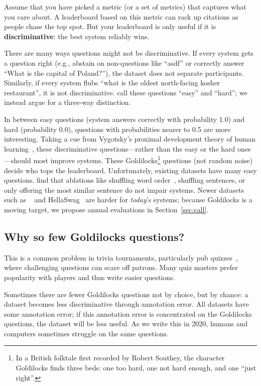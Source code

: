 Assume that you have picked a metric (or a set of metrics) that captures what you care about.
A leaderboard based on this metric can rack up citations as people chase the top spot.
But your leaderboard is only useful if it is {\bf discriminative}: the best system reliably wins.

There are many ways questions might not be discriminative.  
If every system gets a question right (e.g., abstain on non-questions like ``asdf'' or correctly answer ``What is the capital of Poland?''), the dataset does not separate participants.  
Similarly, if every system flubs ``what is the oldest north-facing kosher restaurant'', it is not discriminative.
\citet{sugawara-18} call these questions ``easy'' and ``hard''; we instead argue for a three-way distinction.

In between easy questions (system answers correctly with probability 1.0) and hard (probability 0.0), questions with probabilities nearer to 0.5 are more interesting.
Taking a cue from Vygotsky's proximal development theory of human learning~\citep{chaiklin-03}, these discriminative questions---rather than the easy or the hard ones---should most improve  systems.
These Goldilocks\footnote{In a British folktale first recorded by Robert Southey, the character Goldilocks finds three beds: one too hard, one not hard enough, and one ``just right''.} questions (not random noise) decide who tops the leaderboard.
Unfortunately, existing datasets have many easy questions.
\citet{sugawara-20} find that ablations like shuffling word order~\citep{feng-18}, shuffling sentences, or only offering the most similar sentence do not impair systems.
Newer datasets such as ~\citep{dua-19} and HellaSwag~\citep{zellers-19} are harder for \emph{today}'s systems; because Goldilocks is a moving target, we propose annual evaluations in Section~\ref{sec:call}.

\subsection{Why so few Goldilocks questions?}

This is a common problem in trivia tournaments, particularly pub quizzes~\citep{diamond-09}, where challenging questions can scare off patrons.
Many quiz masters prefer popularity with players and thus write easier questions.

Sometimes there are fewer Goldilocks questions not by choice, but by chance: a dataset becomes less discriminative through annotation error.
All datasets have some annotation error; if this annotation error is concentrated on the Goldilocks questions, the dataset will be less useful.
As we write this in 2020, humans and computers sometimes struggle on the same questions. 

